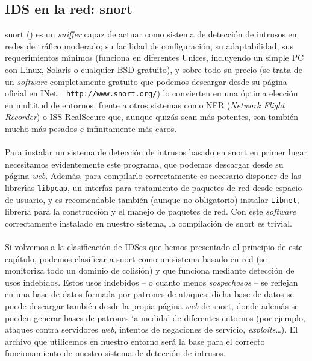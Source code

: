 \subsection{IDS en la red: {\sc snort}}
\label{snort}
{\sc snort} (\cite{kn:roe99}) es un {\it sniffer} capaz de actuar como sistema 
de detecci\'on de intrusos en redes de tr\'afico moderado; su facilidad de 
configuraci\'on, su adaptabilidad, sus requerimientos m\'{\i}nimos (funciona 
en diferentes Unices, incluyendo un simple PC con Linux, Solaris o cualquier 
BSD gratuito), 
y sobre todo su precio (se trata de un {\it software} completamente gratuito
que podemos descargar desde su p\'agina oficial en INet, {\tt 
http://www.snort.org/}) lo convierten en una \'optima elecci\'on en multitud de 
entornos, frente a otros sistemas como NFR ({\it Network Flight Recorder}) o 
ISS RealSecure que, aunque quiz\'as sean m\'as potentes, son tambi\'en mucho
m\'as pesados e infinitamente m\'as caros.\\
\\Para instalar un sistema de detecci\'on de intrusos basado en {\sc snort} 
en primer lugar necesitamos evidentemente este programa, que podemos descargar
desde su p\'agina {\it web}. Adem\'as, para compilarlo correctamente es
necesario disponer de las librer\'{\i}as {\tt libpcap}, un interfaz para
tratamiento de paquetes de red desde espacio de usuario, y es recomendable
tambi\'en (aunque no obligatorio) instalar {\tt Libnet}, librer\'{\i}a para
la construcci\'on y el manejo de paquetes de red. Con este {\it software} 
correctamente instalado en nuestro sistema, la compilaci\'on de {\sc snort} es
trivial.\\
\\Si volvemos a la clasificaci\'on de IDSes que hemos presentado al principio
de este cap\'{\i}tulo, podemos clasificar a {\sc snort} como un sistema basado
en red (se monitoriza todo un dominio de colisi\'on) y que funciona mediante
detecci\'on de usos indebidos. Estos usos indebidos -- o cuanto menos {\it
sospechosos} -- se reflejan en una base de datos formada por patrones de 
ataques; dicha base de datos se puede descargar tambi\'en desde la propia 
p\'agina {\it web} de 
{\sc snort}, donde adem\'as se pueden generar bases de patrones `a medida' de
diferentes entornos (por ejemplo, ataques contra servidores {\it web}, intentos
de negaciones de servicio, {\it exploits}\ldots). El archivo que utilicemos en
nuestro entorno ser\'a la base para el correcto funcionamiento de nuestro 
sistema de detecci\'on de intrusos.\\
